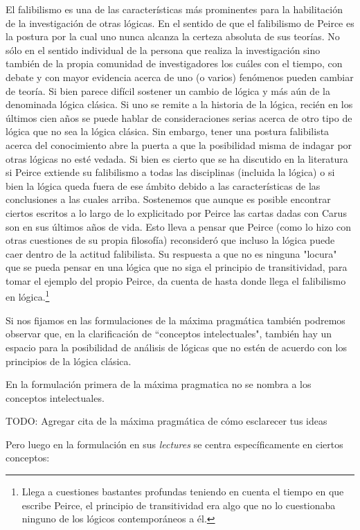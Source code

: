 \documentclass[
  structure  = article,
  pagelayout = periodicalaureo,%
  secfont    = italic,
  subsecfont = italic,
  version    = final,%
]{suftesi}
\begin{document}
El falibilismo es una de las características más prominentes para la habilitación de la investigación de otras lógicas. En el sentido de que el falibilismo de Peirce es la postura por la cual uno nunca alcanza la certeza absoluta de sus teorías. No sólo en el sentido individual de la persona que realiza la investigación sino también de la propia comunidad de investigadores los cuáles con el tiempo, con debate y con mayor evidencia acerca de uno (o varios) fenómenos pueden cambiar de teoría. Si bien parece difícil sostener un cambio de lógica y más aún de la denominada lógica clásica. Si uno se remite a la historia de la lógica, recién en los últimos cien años se puede hablar de consideraciones serias acerca de otro tipo de lógica que no sea la lógica clásica. Sin embargo, tener una postura falibilista acerca del conocimiento abre la puerta a que la posibilidad misma de indagar por otras lógicas no esté vedada. Si bien es cierto que se ha discutido en la literatura si Peirce extiende su falibilismo a todas las disciplinas (incluida la lógica) o si bien la lógica queda fuera de ese ámbito debido a las características de las conclusiones a las cuales arriba. Sostenemos que aunque es posible encontrar ciertos escritos a lo largo de lo explicitado por Peirce las cartas dadas con Carus son en sus últimos años de vida. Esto lleva a pensar que Peirce (como lo hizo con otras cuestiones de su propia filosofía) reconsideró que incluso la lógica puede caer dentro de la actitud falibilista. Su respuesta a que no es ninguna "locura" que se pueda pensar en una lógica que no siga el principio de transitividad, para tomar el ejemplo del propio Peirce, da cuenta de hasta donde llega el falibilismo en lógica.\footnote{Llega a cuestiones bastantes profundas teniendo en cuenta el tiempo en que escribe Peirce, el principio de transitividad era algo que no lo cuestionaba ninguno de los lógicos contemporáneos a él.}

Si nos fijamos en las formulaciones de la máxima pragmática también podremos observar que, en la clarificación de ``conceptos intelectuales", también hay un espacio para la posibilidad de análisis de lógicas que no estén de acuerdo con los principios de la lógica clásica.

En la formulación primera de la máxima pragmatica no se nombra a los conceptos intelectuales.

TODO: Agregar cita de la máxima pragmática de cómo esclarecer tus ideas

Pero luego en la formulación en sus \emph{lectures} se centra específicamente en ciertos conceptos:
\end{document}
